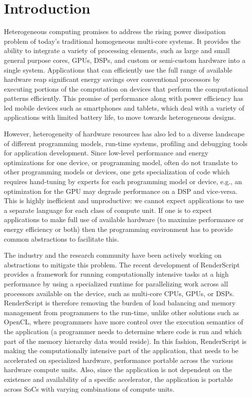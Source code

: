\section{Introduction}

Heterogeneous computing promises to address the rising power dissipation problem
of today's traditional homogeneous multi-core
systems. It provides the ability to integrate a variety of processing elements,
such as large and small general purpose cores, GPUs, DSPs, and custom or
semi-custom hardware into a single system. Applications that can efficiently use
the full range of available hardware reap significant energy
savings over conventional processors by executing portions of the computation on
devices that perform the computational patterns efficiently.
This promise of performance along with power efficiency
has led mobile devices such as smartphones
and tablets, which deal with a variety of applications with limited battery
life, to move towards heterogeneous designs.

However, heterogeneity of hardware resources has also led to a diverse landscape
of different programming models, run-time systems, profiling and debugging tools
for application development. Since low-level performance and energy
optimizations for one device, or
programming model, often do not translate to other programming models or devices, 
one gets specialization of code which requires hand-tuning by experts for each 
programming model or device, e.g., an optimization for the GPU may degrade performance
on a DSP and vice-versa. This is highly inefficient and
unproductive: we cannot expect applications to use a separate language for each
class of compute unit. If one is to expect applications to make full use of
available hardware (to maximize performance or energy efficiency or both) then
the programming environment has to provide common abstractions to facilitate this.

The industry and the research community have been actively working on abstractions
    to mitigate this problem.
The recent development of RenderScript~\cite{wiki:RenderScript, RenderScript}
provides a framework for running computationally intensive tasks at a high
performance by using a specialized runtime for parallelizing work across all
processors available on the device, such as multi-core CPUs, GPUs, or DSPs.
RenderScript is therefore removing the burden of load balancing and memory
management from programmers to the run-time, unlike other solutions such as
OpenCL, where programmers have more control over the execution semantics of
the application (a programmer needs to determine where code is run and
 which part of the memory hierarchy data would reside).  In this fashion,
RenderScript is making the computationally intensive part of the application,
that needs to be accelerated on specialized hardware, performance portable
across the various hardware compute units. Also, since the application is not
dependent on the existence and availability of a specific accelerator, the
application is portable across SoCs with varying combinations of compute units.

